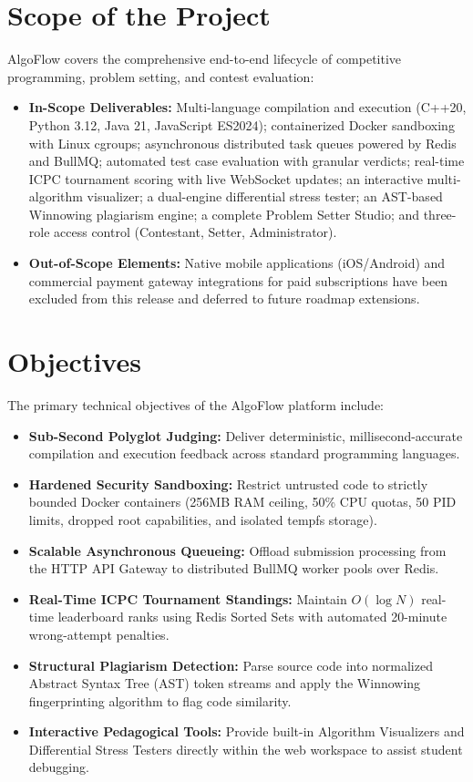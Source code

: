 \documentclass[12pt,a4paper]{report}
\begin{document}
\section{Scope of the Project}
AlgoFlow covers the comprehensive end-to-end lifecycle of competitive programming, problem setting, and contest evaluation:
\begin{itemize}[leftmargin=*]
  \item \textbf{In-Scope Deliverables:} Multi-language compilation and execution (C++20, Python 3.12, Java 21, JavaScript ES2024); containerized Docker sandboxing with Linux cgroups; asynchronous distributed task queues powered by Redis and BullMQ; automated test case evaluation with granular verdicts; real-time ICPC tournament scoring with live WebSocket updates; an interactive multi-algorithm visualizer; a dual-engine differential stress tester; an AST-based Winnowing plagiarism engine; a complete Problem Setter Studio; and three-role access control (Contestant, Setter, Administrator).
  \item \textbf{Out-of-Scope Elements:} Native mobile applications (iOS/Android) and commercial payment gateway integrations for paid subscriptions have been excluded from this release and deferred to future roadmap extensions.
\end{itemize}

\section{Objectives}
The primary technical objectives of the AlgoFlow platform include:
\begin{itemize}[leftmargin=*]
  \item \textbf{Sub-Second Polyglot Judging:} Deliver deterministic, millisecond-accurate compilation and execution feedback across standard programming languages.
  \item \textbf{Hardened Security Sandboxing:} Restrict untrusted code to strictly bounded Docker containers (256MB RAM ceiling, 50\% CPU quotas, 50 PID limits, dropped root capabilities, and isolated tempfs storage).
  \item \textbf{Scalable Asynchronous Queueing:} Offload submission processing from the HTTP API Gateway to distributed BullMQ worker pools over Redis.
  \item \textbf{Real-Time ICPC Tournament Standings:} Maintain $O(\log N)$ real-time leaderboard ranks using Redis Sorted Sets with automated 20-minute wrong-attempt penalties.
  \item \textbf{Structural Plagiarism Detection:} Parse source code into normalized Abstract Syntax Tree (AST) token streams and apply the Winnowing fingerprinting algorithm to flag code similarity.
  \item \textbf{Interactive Pedagogical Tools:} Provide built-in Algorithm Visualizers and Differential Stress Testers directly within the web workspace to assist student debugging.
\end{itemize}
\end{document}
